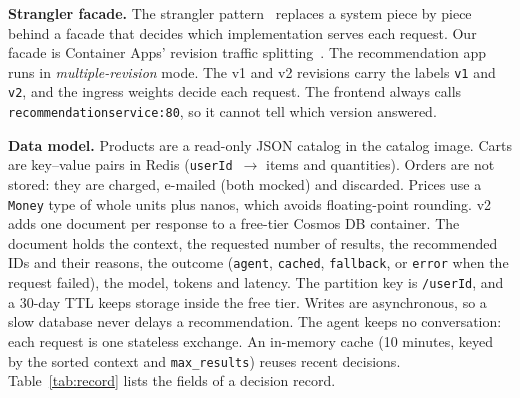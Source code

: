 \documentclass[conference]{IEEEtran}
\begin{document}
\textbf{Strangler facade.} The strangler pattern~\cite{fowler-strangler}
replaces a system piece by piece behind a facade that decides which
implementation serves each request. Our facade is Container Apps' revision
traffic splitting~\cite{aca-traffic}. The recommendation app runs in
\emph{multiple-revision} mode. The v1 and v2 revisions carry the labels
\texttt{v1} and \texttt{v2}, and the ingress weights decide each request.
The frontend always calls \texttt{recommendationservice:80}, so it cannot
tell which version answered.

\textbf{Data model.} Products are a read-only JSON catalog in the catalog
image. Carts are key--value pairs in Redis (\texttt{userId}~$\rightarrow$
items and quantities). Orders are not stored: they are charged, e-mailed
(both mocked) and discarded. Prices use a \texttt{Money} type of whole
units plus nanos, which avoids floating-point rounding. v2 adds one
document per response to a free-tier Cosmos DB container. The document holds
the context, the requested number of results, the recommended IDs and their
reasons, the outcome (\texttt{agent}, \texttt{cached}, \texttt{fallback},
or \texttt{error} when the request failed), the model, tokens and latency. The partition key is \texttt{/userId}, and a 30-day TTL keeps
storage inside the free tier. Writes are asynchronous, so a slow database
never delays a recommendation. The agent keeps no conversation: each
request is one stateless exchange. An in-memory cache (10 minutes, keyed by
the sorted context and \texttt{max\_results}) reuses recent decisions.
Table~\ref{tab:record} lists the fields of a decision record.
\end{document}
